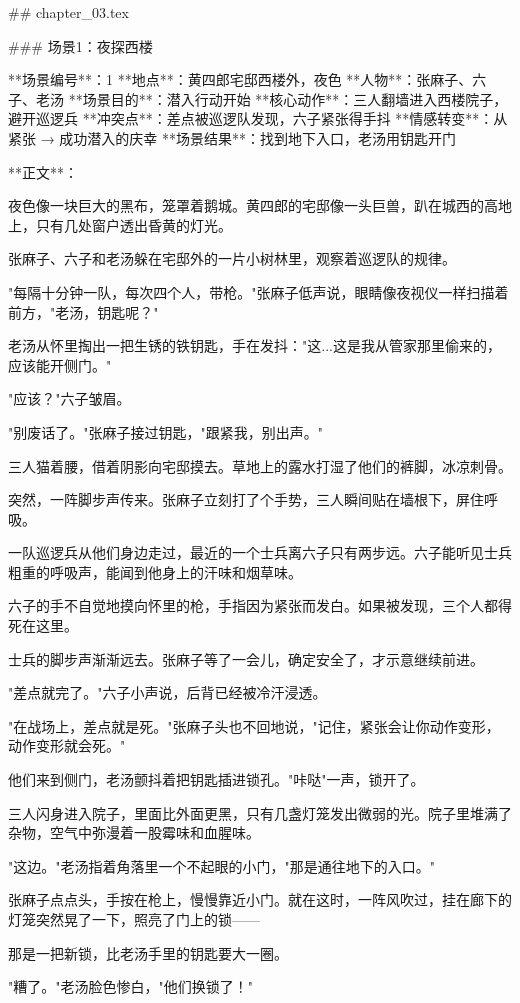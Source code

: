 ## chapter_03.tex

### 场景1：夜探西楼

**场景编号**：1  
**地点**：黄四郎宅邸西楼外，夜色  
**人物**：张麻子、六子、老汤  
**场景目的**：潜入行动开始  
**核心动作**：三人翻墙进入西楼院子，避开巡逻兵  
**冲突点**：差点被巡逻队发现，六子紧张得手抖  
**情感转变**：从紧张 → 成功潜入的庆幸  
**场景结果**：找到地下入口，老汤用钥匙开门

**正文**：

夜色像一块巨大的黑布，笼罩着鹅城。黄四郎的宅邸像一头巨兽，趴在城西的高地上，只有几处窗户透出昏黄的灯光。

张麻子、六子和老汤躲在宅邸外的一片小树林里，观察着巡逻队的规律。

"每隔十分钟一队，每次四个人，带枪。"张麻子低声说，眼睛像夜视仪一样扫描着前方，"老汤，钥匙呢？"

老汤从怀里掏出一把生锈的铁钥匙，手在发抖："这...这是我从管家那里偷来的，应该能开侧门。"

"应该？"六子皱眉。

"别废话了。"张麻子接过钥匙，"跟紧我，别出声。"

三人猫着腰，借着阴影向宅邸摸去。草地上的露水打湿了他们的裤脚，冰凉刺骨。

突然，一阵脚步声传来。张麻子立刻打了个手势，三人瞬间贴在墙根下，屏住呼吸。

一队巡逻兵从他们身边走过，最近的一个士兵离六子只有两步远。六子能听见士兵粗重的呼吸声，能闻到他身上的汗味和烟草味。

六子的手不自觉地摸向怀里的枪，手指因为紧张而发白。如果被发现，三个人都得死在这里。

士兵的脚步声渐渐远去。张麻子等了一会儿，确定安全了，才示意继续前进。

"差点就完了。"六子小声说，后背已经被冷汗浸透。

"在战场上，差点就是死。"张麻子头也不回地说，"记住，紧张会让你动作变形，动作变形就会死。"

他们来到侧门，老汤颤抖着把钥匙插进锁孔。"咔哒"一声，锁开了。

三人闪身进入院子，里面比外面更黑，只有几盏灯笼发出微弱的光。院子里堆满了杂物，空气中弥漫着一股霉味和血腥味。

"这边。"老汤指着角落里一个不起眼的小门，"那是通往地下的入口。"

张麻子点点头，手按在枪上，慢慢靠近小门。就在这时，一阵风吹过，挂在廊下的灯笼突然晃了一下，照亮了门上的锁——

那是一把新锁，比老汤手里的钥匙要大一圈。

"糟了。"老汤脸色惨白，"他们换锁了！"

